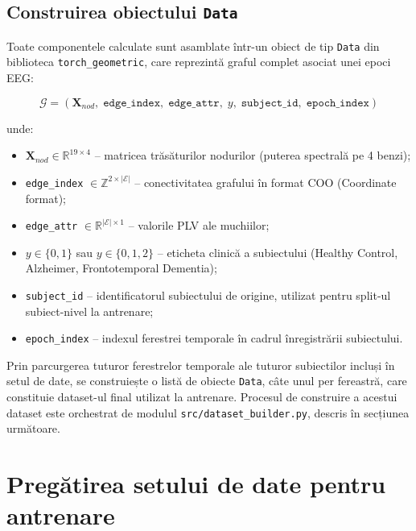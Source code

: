 \documentclass[12pt,a4paper]{report}
\theoremstyle{definition}
\theoremstyle{remark}
\begin{document}
\subsection{Construirea obiectului \texttt{Data}}

Toate componentele calculate sunt asamblate într-un obiect de tip \texttt{Data} din biblioteca \texttt{torch\_geometric}, care reprezintă graful complet asociat unei epoci EEG:

\begin{equation}
    \mathcal{G} = \left(\mathbf{X}_{nod},\; \texttt{edge\_index},\; \texttt{edge\_attr},\; y,\; \texttt{subject\_id},\; \texttt{epoch\_index}\right)
    \label{eq:pyg_data}
\end{equation}

\noindent unde:
\begin{itemize}
    \item $\mathbf{X}_{nod} \in \mathbb{R}^{19 \times 4}$ -- matricea trăsăturilor nodurilor (puterea spectrală pe 4 benzi);
    \item \texttt{edge\_index} $\in \mathbb{Z}^{2 \times |\mathcal{E}|}$ -- conectivitatea grafului în format COO (Coordinate format);
    \item \texttt{edge\_attr} $\in \mathbb{R}^{|\mathcal{E}| \times 1}$ -- valorile PLV ale muchiilor;
    \item $y \in \{0, 1\}$ sau $y \in \{0, 1, 2\}$ -- eticheta clinică a subiectului (Healthy Control, Alzheimer, Frontotemporal Dementia);
    \item \texttt{subject\_id} -- identificatorul subiectului de origine, utilizat pentru split-ul subiect-nivel la antrenare;
    \item \texttt{epoch\_index} -- indexul ferestrei temporale în cadrul înregistrării subiectului.
\end{itemize}

Prin parcurgerea tuturor ferestrelor temporale ale tuturor subiectilor incluși în setul de date, se construiește o listă de obiecte \texttt{Data}, câte unul per fereastră, care constituie dataset-ul final utilizat la antrenare. Procesul de construire a acestui dataset este orchestrat de modulul \texttt{src/dataset\_builder.py}, descris în secțiunea următoare.

\section{Pregătirea setului de date pentru antrenare}
\label{sec:dataset_builder}
\end{document}
